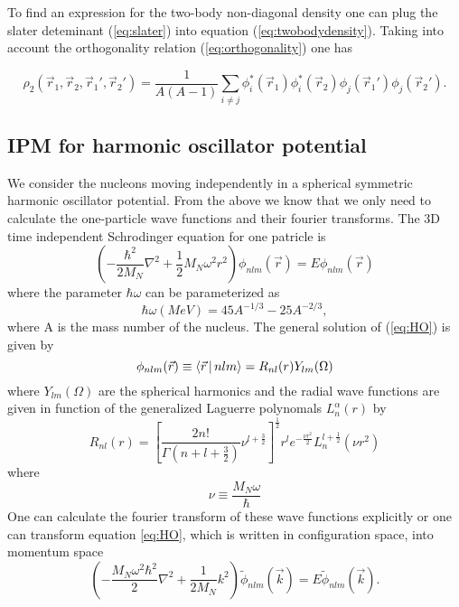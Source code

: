 \documentclass[12pt]{article}
\begin{document}
To find an expression for the two-body non-diagonal density one can plug the slater deteminant (\ref{eq:slater}) into equation (\ref{eq:twobodydensity}). Taking into account the orthogonality relation (\ref{eq:orthogonality}) one has

\begin{equation}
\rho_2(\vec{r}_1,\vec{r}_2, \vec{r}_1',\vec{r}_2') = \frac{1}{A(A-1)} \sum_{i \neq j } \phi^*_i(\vec{r}_1) \phi^*_i(\vec{r}_2) \phi_j(\vec{r}_1') \phi_j(\vec{r}_2').
\end{equation}
	
\subsection{IPM for harmonic oscillator potential}
We consider the nucleons moving independently in a spherical symmetric harmonic oscillator potential. From the above we know that we only need to calculate the one-particle wave functions and their fourier transforms. The 3D time independent Schrodinger equation for one patricle is
\begin{equation} \label{eq:HO}
\left( -\frac{\hbar^2}{2M_N} \nabla^2 + \frac{1}{2} M_N \omega^2 r^2 \right) \phi_{nlm}(\vec{r}) = E\phi_{nlm}(\vec{r})
\end{equation}
where the parameter $\hbar\omega$ can be parameterized as
\begin{equation}
\hbar\omega (MeV) = 45A^{-1/3}-25A^{-2/3},
\end{equation}
where A is the mass number of the nucleus. The general solution of (\ref{eq:HO}) is given by
\begin{equation}
\phi_{nlm}(\vec{r}) \equiv \Braket{\vec{r}|nlm} = R_{nl}(r)Y_{lm}(\Omega)	
\end{equation}
where $Y_{lm}(\Omega)$ are the spherical harmonics and the radial wave functions are given in function of the generalized Laguerre polynomals $L^\alpha_n(r)$ by
\begin{equation}
 R_{nl}(r) = \left[ \frac{2n!}{\Gamma(n+l+\frac{3}{2})}\nu^{l+\frac{3}{2}} \right]^{\frac{1}{2}} r^l e^{-\frac{\nu r^2}{2}} L^{l+\frac{1}{2}}_n(\nu r^2)
\end{equation}
where 
\begin{equation}
\nu \equiv \frac{M_N \omega}{\hbar}
\end{equation}
One can calculate the fourier transform of these wave functions explicitly or one can transform equation \ref{eq:HO}, which is written in configuration space, into momentum space
\begin{equation} \label{eq:HO_momentum}
\left( -\frac{M_N \omega^2 \hbar^2}{2} \nabla^2 + \frac{1}{2M_N} k^2 \right) \tilde{\phi}_{nlm}(\vec{k}) = E\tilde{\phi}_{nlm}(\vec{k}).
\end{equation}
\end{document}
